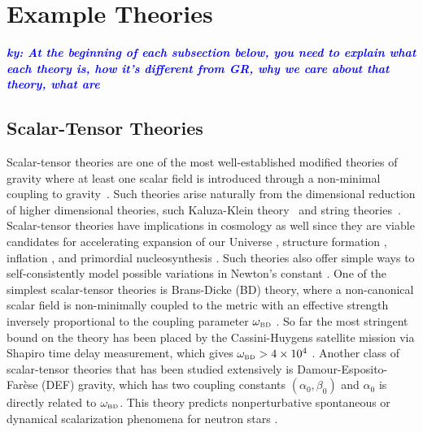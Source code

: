 \documentclass[prd,twocolumn,nofootinbib]{revtex4-1}
\newcommand{\BD}{{\mbox{\tiny BD}}}
\newcommand{\ky}[1]{\textcolor{blue}{\it{\textbf{ky: #1}}} }
\begin{document}
 \section{Example Theories}


\ky{At the beginning of each subsection below, you need to explain what each theory is, how it's different from GR, why we care about that theory, what are }

 \subsection{Scalar-Tensor Theories}
Scalar-tensor theories are one of the most well-established modified theories of gravity where at least one scalar field is introduced through a non-minimal coupling to gravity~\cite{Berti:2015itd,Chiba:1997ms,PhysRevD.6.2077}. Such theories arise naturally from the dimensional reduction of higher dimensional theories, such Kaluza-Klein theory~\cite{Fujii:2003pa,Overduin:1998pn} and string theories~\cite{polchinski1,polchinski2}.
Scalar-tensor theories have implications in cosmology as well since they are viable candidates for accelerating expansion of our Universe \cite{Brax:2004qh,PhysRevD.73.083510,PhysRevD.62.123510,PhysRevD.66.023525,Schimd:2004nq}, structure formation \cite{Brax:2005ew}, inflation \cite{Burd:1991ns,Barrow:1990nv,Banerjee:1993ct,Clifton:2011jh}, and primordial nucleosynthesis \cite{Coc:2006rt,Damour:1998ae,Larena:2005tu,Torres:1995je}. Such theories also offer simple ways to self-consistently model possible variations in Newton's constant \cite{Clifton:2011jh}. One of the simplest scalar-tensor theories is Brans-Dicke (BD) theory, where a non-canonical scalar field is non-minimally coupled to the metric with an effective strength inversely proportional to the coupling parameter $\omega_{\BD}$ \cite{PhysRev.124.925,Scharre:2001hn}. So far the most stringent bound on the theory has been placed by the Cassini-Huygens satellite mission via Shapiro time delay measurement, which gives $\omega_{\BD}>4\times10^4$ \cite{Bertotti:2003rm}. Another class of scalar-tensor theories that has been studied extensively is Damour-Esposito-Far\`ese (DEF) gravity, which has two coupling constants $(\alpha_0,\beta_0)$ and $\alpha_0$ is directly related to $\omega_\BD$. This theory predicts nonperturbative spontaneous or dynamical scalarization phenomena for neutron stars \cite{PhysRevLett.70.2220,Barausse:2012da}. 
\end{document}
